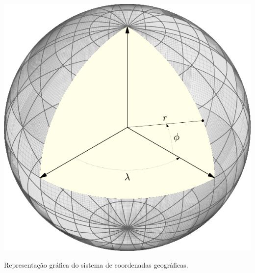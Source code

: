


\begin{marginfigure}[20\baselineskip]
\includegraphics{./cap_algvet/pics/latitude_longitude2}
      \caption{Representação gráfica do sistema de coordenadas geográficas.}
      \label{fig:latlong}
  \end{marginfigure}

